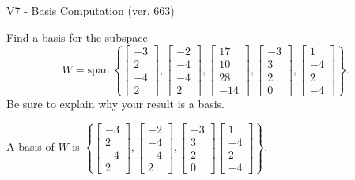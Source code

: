 \begin{exercise}
  \begin{exerciseTitle}V7 - Basis Computation (ver. 663)\end{exerciseTitle}
  \begin{exerciseStatement}
    Find a basis for the subspace 
\[W=\mathrm{span}\ \left\{\left[\begin{array}{r}
-3 \\
2 \\
-4 \\
2
\end{array}\right] , \left[\begin{array}{r}
-2 \\
-4 \\
-4 \\
2
\end{array}\right] , \left[\begin{array}{r}
17 \\
10 \\
28 \\
-14
\end{array}\right] , \left[\begin{array}{r}
-3 \\
3 \\
2 \\
0
\end{array}\right] , \left[\begin{array}{r}
1 \\
-4 \\
2 \\
-4
\end{array}\right]\right\}.\]
 Be sure to explain why your result is a basis.


  \end{exerciseStatement}
  \begin{exerciseAnswer}
   A basis of \(W\) is  \(\left\{\left[\begin{array}{r}
-3 \\
2 \\
-4 \\
2
\end{array}\right] , \left[\begin{array}{r}
-2 \\
-4 \\
-4 \\
2
\end{array}\right] , \left[\begin{array}{r}
-3 \\
3 \\
2 \\
0
\end{array}\right] \left[\begin{array}{r}
1 \\
-4 \\
2 \\
-4
\end{array}\right]\right\}\).
  


  \end{exerciseAnswer}
\end{exercise}